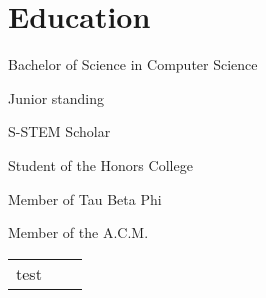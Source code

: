 \documentclass[11pt, letterpaper]{article}
\begin{document}
\section*{Education}
\begin{description}[nosep, style=nextline]
	\item [University of Illinois at Chicago, Chicago, Il] Bachelor of Science in Computer Science 
	\item Junior standing
	\item S-STEM Scholar
	\item Student of the Honors College
	\item Member of Tau Beta Phi
	\item Member of the A.C.M.
\end{description}

\begin{center}
\begin{tabularx}{\textwidth}{l X r}
test & 
\end{tabularx}
\end{center}
\end{document}
